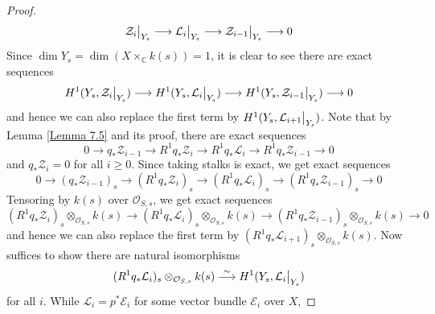 \documentclass{ctexart}
\begin{document}
\begin{proof}
\begin{equation}
        \mathcal{Z}_{i}\big{|}_{Y_{s}} \longrightarrow \mathcal{L}_{i}\big{|}_{Y_{s}} \longrightarrow \mathcal{Z}_{i - 1}\big{|}_{Y_{s}} \longrightarrow 0
    \end{equation}
    Since $\dim Y_{s} = \dim (X \times_{\mathbb{C}} k(s)) = 1$, it is clear to see there are exact sequences
    \begin{equation}
        H^{1}(Y_{s}, \mathcal{Z}_{i}\big{|}_{Y_{s}}) \longrightarrow H^{1}(Y_{s}, \mathcal{L}_{i}\big{|}_{Y_{s}}) \longrightarrow H^{1}(Y_{s}, \mathcal{Z}_{i - 1}\big{|}_{Y_{s}}) \longrightarrow 0
    \end{equation}
    and hence we can also replace the first term by $H^{1}(Y_{s}, \mathcal{L}_{i + 1}\big{|}_{Y_{s}})$.
    Note that by Lemma \ref{Lemma 7.5} and its proof, there are exact sequences
    \begin{equation}
        0 \longrightarrow q_{\ast}\mathcal{Z}_{i - 1} \longrightarrow R^{1}q_{\ast}\mathcal{Z}_{i} \longrightarrow R^{1}q_{\ast}\mathcal{L}_{i} \longrightarrow R^{1}q_{\ast}\mathcal{Z}_{i - 1} \longrightarrow 0
    \end{equation}
    and $q_{\ast}\mathcal{Z}_{i} = 0$ for all $i \ge 0$.
    Since taking stalks is exact, we get exact sequences
    \begin{equation}
        0 \longrightarrow (q_{\ast}\mathcal{Z}_{i - 1})_{s} \longrightarrow (R^{1}q_{\ast}\mathcal{Z}_{i})_{s} \longrightarrow (R^{1}q_{\ast}\mathcal{L}_{i})_{s} \longrightarrow (R^{1}q_{\ast}\mathcal{Z}_{i - 1})_{s} \longrightarrow 0
    \end{equation}
    Tensoring by $k(s)$ over $\mathcal{O}_{S, s}$, we get exact sequences
    \begin{equation}
        (R^{1}q_{\ast}\mathcal{Z}_{i})_{s} \otimes_{\mathcal{O}_{S, s}} k(s) \longrightarrow (R^{1}q_{\ast}\mathcal{L}_{i})_{s} \otimes_{\mathcal{O}_{S, s}} k(s) \longrightarrow (R^{1}q_{\ast}\mathcal{Z}_{i - 1})_{s} \otimes_{\mathcal{O}_{S, s}} k(s) \longrightarrow 0
    \end{equation}
    and hence we can also replace the first term by $(R^{1}q_{\ast}\mathcal{L}_{i + 1})_{s} \otimes_{\mathcal{O}_{S, s}} k(s)$.
    Now suffices to show there are natural isomorphisms 
    \begin{equation}
        (R^{1}q_{\ast}\mathcal{L}_{i})_{s} \otimes_{\mathcal{O}_{S, s}} k(s) \overset{\sim}{\longrightarrow} H^{1}(Y_{s}, \mathcal{L}_{i}\big{|}_{Y_{s}})
    \end{equation}
    for all $i$.
    While $\mathcal{L}_{i} = p^{\ast}\mathcal{E}_{i}$ for some vector bundle $\mathcal{E}_{i}$ over $X$,

\end{proof}
\end{document}

